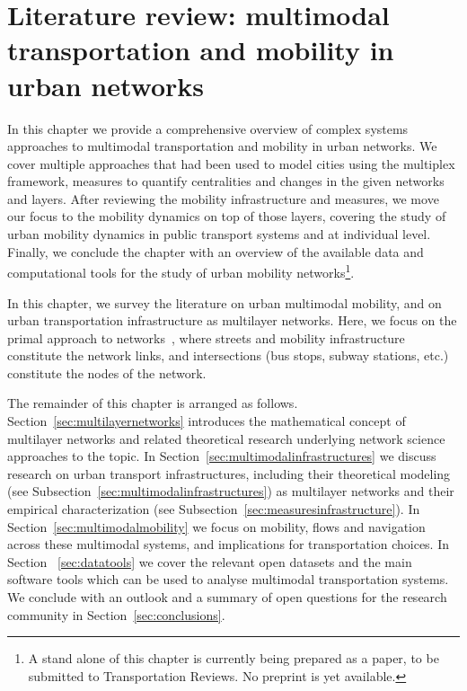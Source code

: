 \chapter[Literature review]{Literature review: multimodal transportation and mobility in urban networks}\label{ch:litReview}

In this chapter we provide a comprehensive overview of complex systems approaches to multimodal transportation and mobility in urban networks. We cover multiple approaches that had been used to model cities using the multiplex framework, measures to quantify centralities and changes in the given networks and layers. After reviewing the mobility infrastructure and measures, we move our focus to the mobility dynamics on top of those layers, covering the study of urban mobility dynamics in public transport systems and at individual level. Finally, we conclude the chapter with an overview of the available data and computational tools for the study of urban mobility networks\footnote{A stand alone of this chapter is currently being prepared as a paper, to be submitted to Transportation Reviews. No preprint is yet available.}.
\pagebreak


In this chapter, we survey the literature on urban multimodal mobility, and on urban transportation infrastructure as multilayer networks. Here, we focus on the primal approach to networks~\cite{porta2006primal}, where streets and mobility infrastructure constitute the network links, and intersections (bus stops, subway stations, etc.) constitute the nodes of the network.

The remainder of this chapter is arranged as follows. Section~\ref{sec:multilayernetworks} introduces the mathematical concept of multilayer networks and related theoretical research underlying network science approaches to the topic. In Section~\ref{sec:multimodalinfrastructures} we discuss research on urban transport infrastructures, including their theoretical modeling (see Subsection~\ref{sec:multimodalinfrastructures}) as multilayer networks and their empirical characterization (see Subsection~\ref{sec:measuresinfrastructure}). In Section~\ref{sec:multimodalmobility} we focus on mobility, flows and navigation across these multimodal systems, and implications for transportation choices. In Section ~\ref{sec:datatools} we cover the relevant open datasets and the main software tools which can be used to analyse multimodal transportation systems. We conclude with an outlook and a summary of open questions for the research community in Section~\ref{sec:conclusions}. 

